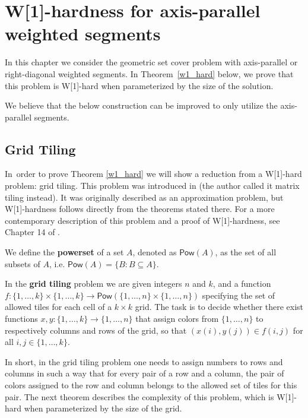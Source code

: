 \chapter{W[1]-hardness for axis-parallel weighted segments}
\label{chapter:w1_hard}

In this chapter we consider the geometric set cover problem with 
axis-parallel or right-diagonal weighted segments.
In Theorem~\ref{w1_hard} below, we prove that this problem is 
W[1]-hard when parameterized by the size of the solution.

We believe that the below construction can be improved to only
utilize the axis-parallel segments.

\wOneHard*

\section{Grid Tiling}

In~order to prove Theorem \ref{w1_hard}
we will show a reduction from a W[1]-hard problem: grid tiling.
This problem was introduced in \cite{marx_grid_tiling}
(the author called it matrix tiling instead).
It was originally described as an approximation problem,
but W[1]-hardness follows directly from the theorems stated there.
For a more contemporary description of this problem
and a proof of W[1]-hardness, see Chapter 14 of \cite{platypus_book}.

\newcommand{\pow}{\mathsf{Pow}}

\begin{defi}
We define the \textbf{powerset} of a set $A$, denoted as $\pow(A)$,
as the set of all subsets of $A$, i.e. $\pow(A) = \{B : B \subseteq A\}$.
\end{defi}

\begin{defi}
In the \textbf{grid tiling} problem we are given integers $n$ and $k$,
and a function
$f : \{1, \ldots, k\} \times \{1, \ldots, k\} \rightarrow \pow(\{1, \ldots, n\} \times \{1, \ldots, n\})$
specifying the set of allowed tiles for each cell of a $k \times k$ grid.
The task is to decide whether there exist functions
$x,y : \{1, \ldots, k\} \rightarrow \{1, \ldots, n\}$
that assign colors from $\{1, \ldots, n\}$
to respectively columns and rows of the grid,
so that $(x(i), y(j)) \in f(i, j)$ for all $i,j \in \{1, \ldots, k\}$.
\end{defi}

In short, in the grid tiling problem one needs to assign numbers
to rows and columns in such a way
that for every pair of a row and a column,
the pair of colors assigned
to the row and column 
belongs to the allowed set of tiles for this pair.
The next theorem describes the complexity of this problem,
which is W[1]-hard when parameterized by the size of the grid.

